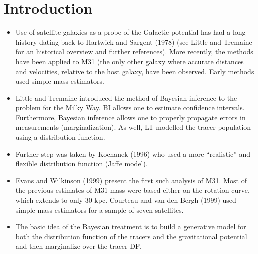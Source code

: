 \documentclass[preprint]{aastex}
\begin{document}


%
%
%













\section{Introduction}

\begin{itemize}

\item Use of satellite galaxies as a probe of the Galactic potential
has had a long history dating back to Hartwick and Sargent (1978) (see
Little and Tremaine for an historical overview and further
references).  More recently, the methods have been applied to M31 (the
only other galaxy where accurate distances and velocities, relative to
the host galaxy, have been observed.  Early methods used simple mass
estimators.

\item Little and Tremaine introduced the method of Bayesian inference
to the problem for the Milky Way.  BI allows one to estimate
confidence intervals.  Furthermore, Bayesian inference allows one to
properly propagate errors in measurements (marginalization).  As well,
LT modelled the tracer population using a distribution function.

\item Further step was taken by Kochanek (1996) who used a more ``realistic''
and flexible distribution function (Jaffe model).

\item Evans and Wilkinson (1999) present the first such analysis of
M31.  Most of the previous estimates of M31 mass were based either on
the rotation curve, which extends to only 30 kpc.  Courteau and van
den Bergh (1999) used simple mass estimators for a sample of seven
satellites.

\item The basic idea of the Bayesian treatment is to build a
generative model for both the distribution function of the tracers and
the gravitational potential and then marginalize over the tracer DF.

\end{itemize}
\end{document}
